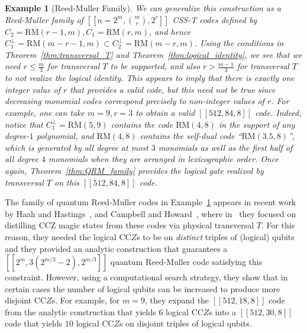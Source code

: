 \documentclass[twoside,romanappendices]{IEEEtran}
\newtheorem{example}{Example}
\newcommand{\llbr}{[\![}
\newcommand{\rrbr}{]\!]}
\begin{document}
\begin{example}[Reed-Muller Family]
\label{ex:QRM_family}
\normalfont
We can generalize this construction as a Reed-Muller family of $\llbr n = 2^m, \binom{m}{r}, 2^{r} \rrbr$ CSS-T codes defined by $C_2 = \text{RM}(r-1,m), C_1 = \text{RM}(r,m)$, and hence $C_1^{\perp} = \text{RM}(m-r-1,m) \subset C_2^{\perp} = \text{RM}(m-r,m)$.
Using the conditions in Theorem~\ref{thm:transversal_T} and Theorem~\ref{thm:logical_identity}, we see that we need $r \leq \frac{m}{3}$ for transversal $T$ to be supported, and also $r > \frac{m-1}{3}$ for transversal $T$ to not realize the logical identity.
This appears to imply that there is exactly one integer value of $r$ that provides a valid code, but this need not be true since decreasing monomial codes correspond precisely to non-integer values of $r$.
For example, one can take $m = 9, r = 3$ to obtain a valid $\llbr 512,84,8 \rrbr$ code.
Indeed, notice that $C_1^{\perp} = \text{RM}(5,9)$ contains the code $\text{RM}(4,8)$ in the support of any degree-$1$ polynomial, and $\text{RM}(4,8)$ contains the self-dual code ``$\text{RM}(3.5,8)$'', which is generated by all degree at most $3$ monomials as well as the first half of all degree $4$ monomials when they are arranged in lexicographic order.
Once again, Theorem~\ref{thm:QRM_family} provides the logical gate realized by transversal $T$ on this $\llbr 512,84,8 \rrbr$ code.
\end{example}


The family of quantum Reed-Muller codes in Example~\ref{ex:QRM_family} appears in recent work by Haah and Hastings~\cite{Haah-quantum17b}, and Campbell and Howard~\cite{Campbell-pra17,Campbell-prl17}, where in~\cite{Haah-quantum17b} they focused on distilling CCZ magic states from these codes via physical transversal $T$.
For this reason, they needed the logical CC$Z$s to be on \emph{distinct} triples of (logical) qubits and they provided an analytic construction that guarantees a $\llbr 2^m, 3(2^{m/3}-2), 2^{m/3} \rrbr$ quantum Reed-Muller code satisfying this constraint.
However, using a computational search strategy, they show that in certain cases the number of logical qubits can be increased to produce more disjoint CC$Z$s.
For example, for $m = 9$, they expand the $\llbr 512,18,8 \rrbr$ code from the analytic construction that yields $6$ logical CC$Z$s into a $\llbr 512,30,8 \rrbr$ code that yields $10$ logical CC$Z$s on disjoint triples of logical qubits.
\end{document}
